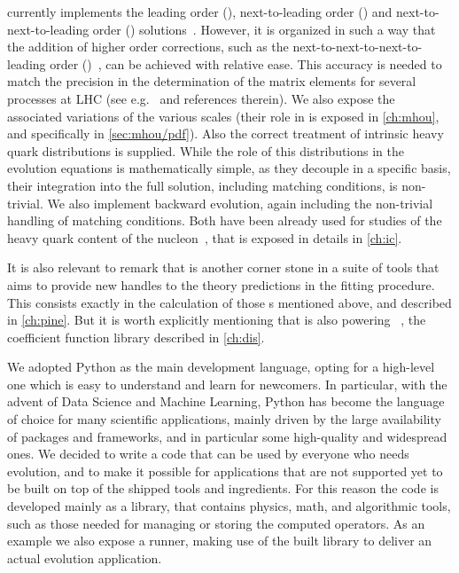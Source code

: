 \eko{} currently implements the leading order (\lo{}),
next-to-leading order (\nlo{}) and next-to-next-to-leading order (\nnlo{})
solutions~\cite{Vogt:2004mw,Moch:2004pa,Blumlein:2021enk}.
However, it is organized in such a way that the addition of higher order corrections,
such as the next-to-next-to-next-to-leading order (\nnnlo{})~\cite{Moch:2021qrk},
can be achieved with relative ease.
This accuracy is needed to match the precision in the determination of the
matrix elements for several processes at LHC (see e.g.\ \cite{Duhr:2021vwj} and
references therein).
We also expose the associated variations of the various scales (their role in
\pdfs is exposed in \cref{ch:mhou}, and specifically in \cref{sec:mhou/pdf}).
%
Also the correct treatment of intrinsic heavy quark distributions is supplied.
While the role of this distributions in the evolution equations is
mathematically simple, as they decouple in a specific basis, their integration
into the full solution, including matching conditions, is non-trivial. We also
implement backward evolution, again including the non-trivial handling of
matching conditions.
Both have been already used for studies of the heavy quark content of the
nucleon~\cite{Ball:2022qks}, that is exposed in details in \cref{ch:ic}.

It is also relevant to remark that \eko is another corner stone in a suite of
tools that aims to provide new handles to the theory predictions in the \pdf
fitting procedure.
This consists exactly in the calculation of those \fktab{}s mentioned above,
and described in \cref{ch:pine}.
But it is worth explicitly mentioning that \eko is also powering
\yadism~\cite{yadism}, the \dis coefficient function library described in
\cref{ch:dis}.

We adopted Python as the main development language, opting for a high-level one
which is easy to understand and learn for newcomers.
In particular, with the advent of Data Science and Machine Learning, Python has
become the language of choice for many scientific applications, mainly driven
by the large availability of packages and frameworks, and in particular some
high-quality and widespread ones.
We decided to write a code that can be used by everyone who needs \qcd
evolution, and to make it possible for applications that are not supported yet
to be built on top of the shipped tools and ingredients.
For this reason the code is developed mainly as a library, that contains
physics, math, and algorithmic tools, such as those needed for managing or
storing the computed operators.
As an example we also expose a runner, making use of the built library to
deliver an actual evolution application. 
\newline

